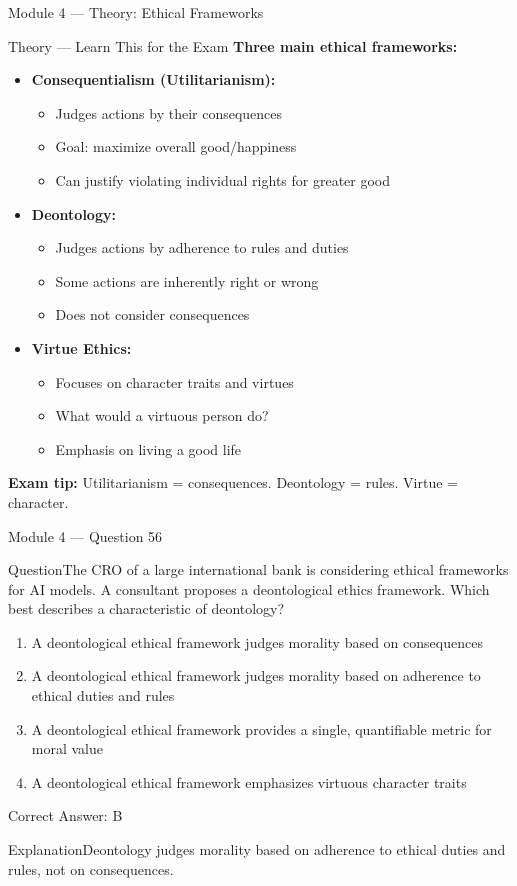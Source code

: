 \documentclass[aspectratio=169,10pt]{beamer}
\newcommand{\question}[1]{\begin{block}{Question}#1\end{block}}
\newcommand{\options}[4]{%
	\begin{enumerate}[label=\Alph*.,leftmargin=*]
		\item #1
		\item #2
		\item #3
		\item #4
	\end{enumerate}
}
\newcommand{\answerbox}[1]{\begin{exampleblock}{Correct Answer: #1}\end{exampleblock}}
\newcommand{\explain}[1]{\begin{block}{Explanation}#1\end{block}}
\newcommand{\theory}[1]{%
	\begin{block}{Theory --- Learn This for the Exam}
		\small #1
	\end{block}
}
\begin{document}
	\begin{frame}{Module 4 --- Theory: Ethical Frameworks}
		\theory{
			\textbf{Three main ethical frameworks:}
			\begin{itemize}
				\item \textbf{Consequentialism (Utilitarianism):}
				\begin{itemize}
					\item Judges actions by their consequences
					\item Goal: maximize overall good/happiness
					\item Can justify violating individual rights for greater good
				\end{itemize}
				\item \textbf{Deontology:}
				\begin{itemize}
					\item Judges actions by adherence to rules and duties
					\item Some actions are inherently right or wrong
					\item Does not consider consequences
				\end{itemize}
				\item \textbf{Virtue Ethics:}
				\begin{itemize}
					\item Focuses on character traits and virtues
					\item What would a virtuous person do?
					\item Emphasis on living a good life
				\end{itemize}
			\end{itemize}
			\textbf{Exam tip:} Utilitarianism = consequences. Deontology = rules. Virtue = character.
		}
	\end{frame}
	
	\begin{frame}{Module 4 --- Question 56}
		\question{The CRO of a large international bank is considering ethical frameworks for AI models. A consultant proposes a deontological ethics framework. Which best describes a characteristic of deontology?}
		\options{A deontological ethical framework judges morality based on consequences}{A deontological ethical framework judges morality based on adherence to ethical duties and rules}{A deontological ethical framework provides a single, quantifiable metric for moral value}{A deontological ethical framework emphasizes virtuous character traits}
		\answerbox{B}
		\explain{Deontology judges morality based on adherence to ethical duties and rules, not on consequences.}
	\end{frame}
	
\end{document}
